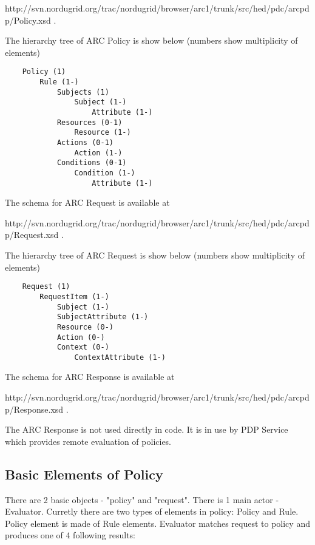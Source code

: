\documentclass{book}
\begin{document}
http://svn.nordugrid.org/trac/nordugrid/browser/arc1/trunk/src/hed/pdc/arcpdp/Policy.xsd .

The hierarchy tree of ARC Policy is show below (numbers show multiplicity of elements)

\begin{verbatim}
    Policy (1)
        Rule (1-)
            Subjects (1)
                Subject (1-)
                    Attribute (1-)
            Resources (0-1)
                Resource (1-)
            Actions (0-1)
                Action (1-)
            Conditions (0-1)
                Condition (1-)
                    Attribute (1-)
\end{verbatim}

The schema for ARC Request is available at

http://svn.nordugrid.org/trac/nordugrid/browser/arc1/trunk/src/hed/pdc/arcpdp/Request.xsd .

The hierarchy tree of ARC Request is show below (numbers show multiplicity of elements)

\begin{verbatim}
    Request (1)
        RequestItem (1-)
            Subject (1-)
	        SubjectAttribute (1-)
            Resource (0-)
            Action (0-)
            Context (0-)
                ContextAttribute (1-)
\end{verbatim}


The schema for ARC Response is available at

http://svn.nordugrid.org/trac/nordugrid/browser/arc1/trunk/src/hed/pdc/arcpdp/Response.xsd .

The ARC Response is not used directly in code. It is in use by PDP Service which provides remote evaluation of policies. 


\subsection{Basic Elements of Policy} %
\label{subsec:poicy_element}
There are 2 basic objects - "policy" and "request". There is 1 main actor - Evaluator. Curretly there are two types of elements in policy: Policy and Rule. Policy element is made of Rule elements.
Evaluator matches request to policy and produces one of 4 following results:
\end{document}
